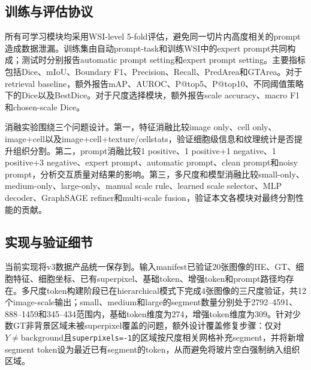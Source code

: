 \documentclass[UTF8]{ctexart}
\begin{document}
\subsection{训练与评估协议}

所有可学习模块均采用WSI-level 5-fold评估，避免同一切片内高度相关的prompt造成数据泄漏。训练集由自动prompt-task和训练WSI中的expert prompt共同构成；测试时分别报告automatic prompt setting和expert prompt setting。主要指标包括Dice、mIoU、Boundary F1、Precision、Recall、PredArea和GTArea。对于retrieval baseline，额外报告mAP、AUROC、P@top5、P@top10、不同阈值策略下的Dice以及BestDice。对于尺度选择模块，额外报告scale accuracy、macro F1和chosen-scale Dice。

消融实验围绕三个问题设计。第一，特征消融比较image only、cell only、image+cell以及image+cell+texture/cellstats，验证细胞级信息和纹理统计是否提升组织分割。第二，prompt消融比较1 positive、1 positive+1 negative、1 positive+3 negative、expert prompt、automatic prompt、clean prompt和noisy prompt，分析交互质量对结果的影响。第三，多尺度和模型消融比较small-only、medium-only、large-only、manual scale rule、learned scale selector、MLP decoder、GraphSAGE refiner和multi-scale fusion，验证本文各模块对最终分割性能的贡献。

\subsection{实现与验证细节}

当前实现将v3数据产品统一保存到。输入manifest已验证20张图像的HE、GT、细胞特征、细胞坐标、已有superpixel、基础token、增强token和prompt路径均存在。多尺度token构建阶段已在hierarchical模式下完成4张图像的三尺度验证，共12个image-scale输出；small、medium和large的segment数量分别处于2792--4591、888--1459和345--434范围内，基础token维度为274，增强token维度为309。针对少数GT非背景区域未被superpixel覆盖的问题，额外设计覆盖修复步骤：仅对$Y\neq\text{background}$且\texttt{superpixels=-1}的区域按尺度相关网格补充segment，并将新增segment token设为最近已有segment的token，从而避免将玻片空白强制纳入组织区域。
\end{document}
